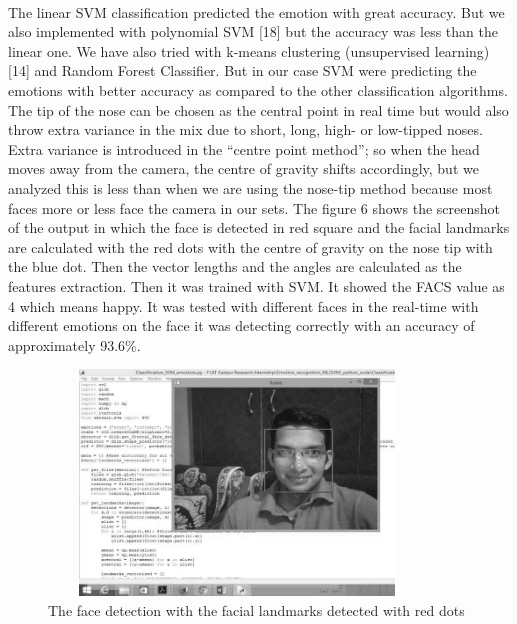 \documentclass[a4paper,12pt,oneside]{article}
\begin{document}
\paragraph{}
The linear SVM classification predicted the emotion
with great accuracy. But we also implemented with
polynomial SVM [18] but the accuracy was less than the
linear one. We have also tried with k-means clustering
(unsupervised learning) [14] and Random Forest
Classifier. But in our case SVM were predicting the
emotions with better accuracy as compared to the other
classification algorithms. The tip of the nose can be
chosen as the central point in real time but would
also throw extra variance in the mix due to short, long,
high- or low-tipped noses. Extra variance is
introduced in the “centre point method”; so when the
head moves away from the camera, the centre of gravity
shifts accordingly, but we analyzed this is less than when
we are using the nose-tip method because most faces
more or less face the camera in our sets. The figure 6
shows the screenshot of the output in which the face is
detected in red square and the facial landmarks are
calculated with the red dots with the centre of gravity on
the nose tip with the blue dot. Then the vector lengths
and the angles are calculated as the features extraction.
Then it was trained with SVM. It showed the FACS
value as 4 which means happy. It was tested with
different faces in the real-time with different emotions
on the face it was detecting correctly with an accuracy of
approximately 93.6\%.
\hfill \break
\hfill \break
\begin{figure}[H]
\centering
\includegraphics[height=6cm,width=10cm]{Facial-emotion-recognition-in-real-time-and-static-images-031.jpg}
\caption{ The face detection with the facial
landmarks detected with red dots}
\end{figure}
\end{document}
